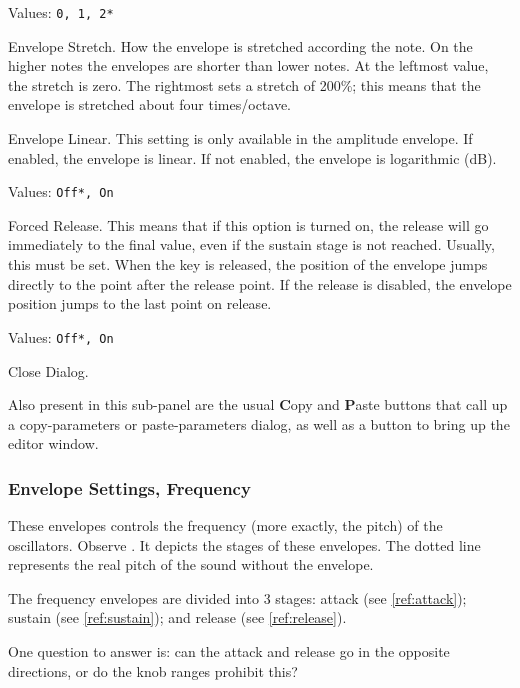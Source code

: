    Values: \texttt{0, 1, 2*}

   Envelope Stretch.
   How the envelope is stretched according the note. On the higher notes the
   envelopes are shorter than lower notes. At the leftmost value, the
   stretch is zero. The rightmost sets a stretch of 200\%; this means that the
   envelope is stretched about four times/octave.

   Envelope Linear.
   This setting is only available in the amplitude envelope.
   If enabled, the envelope is linear.
   If not enabled, the envelope is logarithmic (dB).

   Values: \texttt{Off*, On}

   Forced Release.
   This means that if this option is turned on, the release will go
   immediately to the final value, even if the sustain stage is not reached.
   Usually, this must be set.
   When the key is released, the position of the envelope jumps directly to
   the point after the release point. If the release is disabled, the
   envelope position jumps to the last point on release.

   Values: \texttt{Off*, On}

   Close Dialog.

   Also present in this sub-panel are the usual \textbf{C}opy
   and \textbf{P}aste buttons that call up a copy-parameters or
   paste-parameters dialog, as well as a button
   to bring up the editor window.

\subsubsection{Envelope Settings, Frequency}
\label{subsubsec:envelope_settings_for_frequency}

   These envelopes controls the frequency (more exactly, the pitch) of the
   oscillators.
   Observe .
   It depicts the stages of these envelopes.
   The dotted line represents the real pitch of the sound without the envelope.

   The frequency envelopes are divided into 3 stages:
   attack (see \ref{ref:attack});
   sustain (see \ref{ref:sustain});
   and
   release (see \ref{ref:release}).

   One question to answer is:
   can the attack and release go in the opposite directions, or do the knob
   ranges prohibit this?

